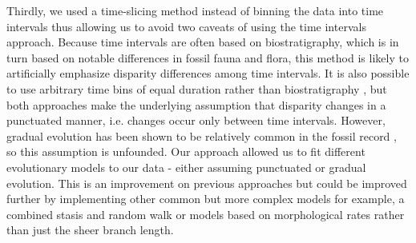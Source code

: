 \documentclass[12pt,letterpaper]{article}
\begin{document}
Thirdly, we used a time-slicing method instead of binning the data into time intervals \citep[e.g in:][]{cisneros2010,prentice2011,Hughes20082013,hopkinsdecoupling2013,bentonmodels2014,bensonfaunal2014} thus allowing us to avoid two caveats of using the time intervals approach.
Because time intervals are often based on biostratigraphy, which is in turn based on notable differences in fossil fauna and flora, this method is likely to artificially emphasize disparity differences among time intervals.
It is also possible to use arbitrary time bins of equal duration rather than biostratigraphy \citep{Butler2012,hopkinsdecoupling2013,bensonfaunal2014}, but both approaches make the underlying assumption that disparity changes in a punctuated  manner, i.e. changes occur only between time intervals.
However, gradual evolution has been shown to be relatively common in the fossil record \citep{Hunt20112007,Hunt21042015}, so this assumption is unfounded.
Our approach allowed us to fit different evolutionary models to our data - either assuming punctuated or gradual evolution.
This is an improvement on previous approaches but could be improved further by implementing other common but more complex models for example, a combined stasis and random walk \citep{Hunt21042015} or models based on morphological rates rather than just the sheer branch length.


\end{document}
